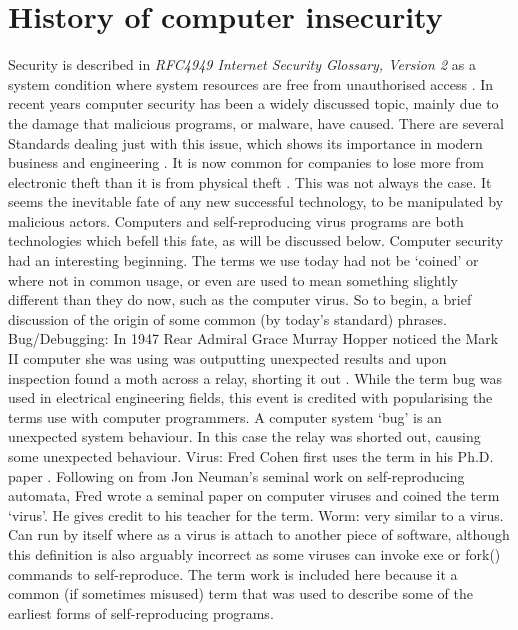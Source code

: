 \section{History of computer insecurity}
Security is described in \textit{RFC4949 Internet Security Glossary, Version 2} as a system condition where system resources are free from unauthorised access 
\cite{RN66}. In recent years computer security has been a widely discussed topic, mainly due to the damage that malicious programs, or malware, have caused. There are several Standards dealing just with this issue, which shows its importance in modern business and engineering 
\cite{RN70}\cite{RN68}\cite{RN69}. It is now common for companies to lose more from electronic theft than it is from physical theft 
\cite{RN76}. This was not always the case. It seems the inevitable fate of any new successful technology, to be manipulated by malicious actors. Computers and self-reproducing virus programs are both technologies which befell this fate, as will be discussed below.
Computer security had an interesting beginning. The terms we use today had not be ‘coined’ or where not in common usage, or even are used to mean something slightly different than they do now, such as the computer virus. So to begin, a brief discussion of the origin of some common (by today's standard) phrases. 
Bug/Debugging: In 1947 Rear Admiral Grace Murray Hopper noticed the Mark II computer she was using was outputting unexpected results and upon inspection found a moth across a relay, shorting it out \cite{RN75}. While the term bug was used in electrical engineering fields, this event is credited with popularising the terms use with computer programmers. A computer system ‘bug’ is an unexpected system behaviour. In this case the relay was shorted out, causing some unexpected behaviour. 
Virus: Fred Cohen first uses the term in his Ph.D. paper . Following on from Jon Neuman’s seminal work on self-reproducing automata, Fred wrote a seminal paper on computer viruses and coined the term ‘virus’. He gives credit to his teacher for the term.
Worm: very similar to a virus. Can run by itself where as a virus is attach to another piece of software, although this definition is also arguably incorrect as some viruses can invoke exe or fork() commands to self-reproduce. The term work is included here because it a common (if sometimes misused) term that was used to describe some of the earliest forms of self-reproducing programs.
